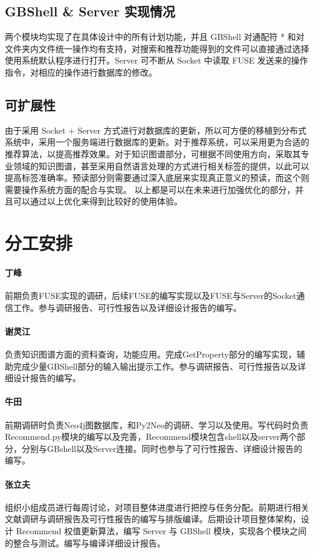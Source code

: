 \documentclass[UTF8]{ctexart}
\begin{document}
\subsection{GBShell \& Server 实现情况}
两个模块均实现了在具体设计中的所有计划功能，并且 GBShell 对通配符 * 和对文件夹内文件统一操作均有支持，对搜索和推荐功能得到的文件可以直接通过选择使用系统默认程序进行打开。Server 可不断从 Socket 中读取 FUSE 发送来的操作指令，对相应的操作进行数据库的修改。

\subsection{可扩展性}
由于采用 Socket + Server 方式进行对数据库的更新，所以可方便的移植到分布式系统中，采用一个服务端进行数据库的更新。对于推荐系统，可以采用更为合适的推荐算法，以提高推荐效果。对于知识图谱部分，可根据不同使用方向，采取其专业领域的知识图谱，甚至采用自然语言处理的方式进行相关标签的提供，以此可以提高标签准确率。预读部分则需要通过深入底层来实现真正意义的预读，而这个则需要操作系统方面的配合与实现。
以上都是可以在未来进行加强优化的部分，并且可以通过以上优化来得到比较好的使用体验。

\section{分工安排}
\paragraph{丁峰} 前期负责FUSE实现的调研，后续FUSE的编写实现以及FUSE与Server的Socket通信工作。参与调研报告、可行性报告以及详细设计报告的编写。

\paragraph{谢灵江} 负责知识图谱方面的资料查询，功能应用。完成GetProperty部分的编写实现，辅助完成少量GBShell部分的输入输出提示工作。参与调研报告、可行性报告以及详细设计报告的编写。

\paragraph{牛田} 前期调研时负责Neo4j图数据库，和Py2Neo的调研、学习以及使用。写代码时负责Recommend.py模块的编写以及完善，Recommend模块包含shell以及server两个部分，分别与GBshell以及Server连接。同时也参与了可行性报告、详细设计报告的编写。

\paragraph{张立夫}组织小组成员进行每周讨论，对项目整体进度进行把控与任务分配。前期进行相关文献调研与调研报告及可行性报告的编写与排版编译。后期设计项目整体架构，设计 Recommend 权值更新算法，编写 Server 与 GBShell 模块，实现各个模块之间的整合与测试。编写与编译详细设计报告。
\end{document}
